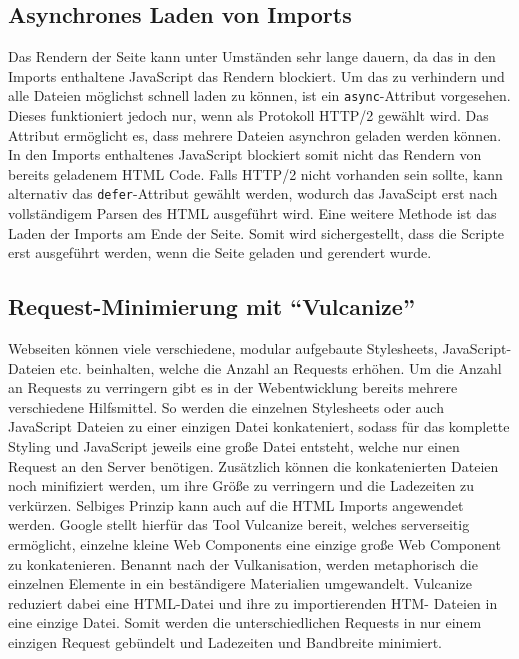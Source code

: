 \subsection{Asynchrones Laden von Imports}\label{asynchrones-laden-von-imports}

Das Rendern der Seite kann unter Umständen sehr lange dauern, da das in den Imports enthaltene JavaScript das Rendern blockiert. Um das zu verhindern und alle Dateien möglichst schnell laden zu können, ist ein \texttt{async}-Attribut vorgesehen. Dieses funktioniert jedoch nur, wenn als Protokoll HTTP/2 gewählt wird. Das Attribut ermöglicht es, dass mehrere Dateien asynchron geladen werden können. In den Imports enthaltenes JavaScript blockiert somit nicht das Rendern von bereits geladenem HTML Code. Falls HTTP/2 nicht vorhanden sein sollte, kann alternativ das \texttt{defer}-Attribut gewählt werden, wodurch das JavaScipt erst nach vollständigem Parsen des HTML ausgeführt wird. Eine weitere Methode ist das Laden der Imports am Ende der Seite. Somit wird sichergestellt, dass die Scripte erst ausgeführt werden, wenn die Seite geladen und gerendert wurde.


\subsection{\texorpdfstring{Request-Minimierung mit ``Vulcanize''}{Request-Minimierung mit Vulcanize}}\label{request-minimierung-mit-vulcanize}

Webseiten können viele verschiedene, modular aufgebaute Stylesheets, JavaScript-Dateien etc. beinhalten, welche die Anzahl an Requests erhöhen. Um die Anzahl an Requests zu verringern gibt es in der Webentwicklung bereits mehrere verschiedene Hilfsmittel. So werden die einzelnen Stylesheets oder auch JavaScript Dateien zu einer einzigen Datei konkateniert, sodass für das komplette Styling und JavaScript jeweils eine große Datei entsteht, welche nur einen Request an den Server benötigen. Zusätzlich können die konkatenierten Dateien noch minifiziert werden, um ihre Größe zu verringern und die Ladezeiten zu verkürzen. Selbiges Prinzip kann auch auf die HTML Imports angewendet werden. Google stellt hierfür das Tool Vulcanize \cite{citeulike:13879681} bereit, welches serverseitig ermöglicht, einzelne kleine Web Components eine einzige große Web Component zu konkatenieren. Benannt nach der Vulkanisation, werden metaphorisch die einzelnen Elemente in ein beständigere Materialien umgewandelt. Vulcanize reduziert dabei eine HTML-Datei und ihre zu importierenden HTM- Dateien in eine einzige Datei. Somit werden die unterschiedlichen Requests in nur einem einzigen Request gebündelt und Ladezeiten und Bandbreite minimiert.


